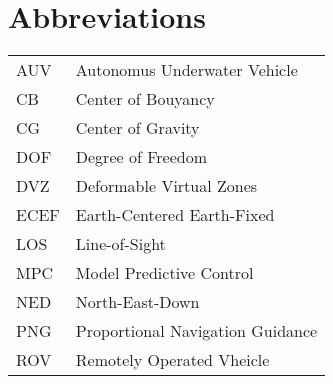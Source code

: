 \chapter{Abbreviations}
\begin{center}
\begin{tabular}{|l|l|}
\hline
AUV & Autonomus Underwater Vehicle \\
CB & Center of Bouyancy\\
CG & Center of Gravity \\
DOF & Degree of Freedom \\
DVZ & Deformable Virtual Zones \\
ECEF & Earth-Centered Earth-Fixed \\
LOS & Line-of-Sight\\
MPC & Model Predictive Control \\
NED & North-East-Down \\
PNG & Proportional Navigation Guidance \\
ROV & Remotely Operated Vheicle \\
\hline
\end{tabular}
\end{center}
